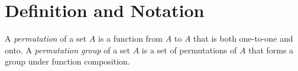 \section{Definition and Notation}

\begin{definition}
	A \textit{permutation} of a set $A$ is a function from $A$ to $A$ that is both one-to-one and onto. A \textit{permutation group} of a set $A$ is a set of permutations of $A$ that forms a group under function composition.
\end{definition}
